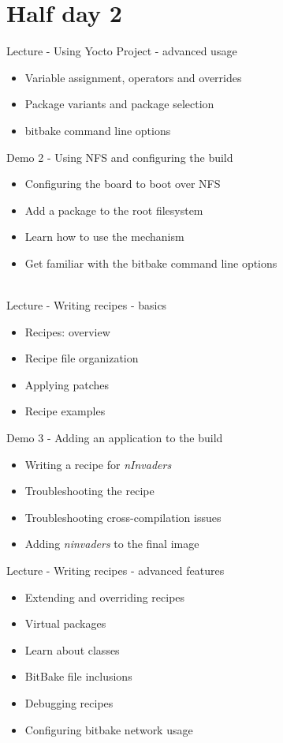 \documentclass[a4paper,12pt,obeyspaces,spaces,hyphens]{article}
\begin{document}
\section{Half day 2}

\feagendatwocolumn
{Lecture - Using Yocto Project - advanced usage}
{
  \begin{itemize}
  \item Variable assignment, operators and overrides
  \item Package variants and package selection
  \item bitbake command line options
  \end{itemize}
}
{Demo 2 - Using NFS and configuring the build}
{
  \begin{itemize}
  \item Configuring the board to boot over NFS
  \item Add a package to the root filesystem
  \item Learn how to use the  mechanism
  \item Get familiar with the bitbake command line options
  \end{itemize}
}
\\

\feagendatwocolumn
{Lecture - Writing recipes - basics}
{
  \begin{itemize}
  \item Recipes: overview
  \item Recipe file organization
  \item Applying patches
  \item Recipe examples
  \end{itemize}
}
{Demo 3 - Adding an application to the build}
{
  \begin{itemize}
  \item Writing a recipe for {\em nInvaders}
  \item Troubleshooting the recipe
  \item Troubleshooting cross-compilation issues
  \item Adding {\em ninvaders} to the final image
  \end{itemize}
}

\feagendaonecolumn
{Lecture - Writing recipes - advanced features}
{
  \begin{itemize}
  \item Extending and overriding recipes
  \item Virtual packages
  \item Learn about classes
  \item BitBake file inclusions
  \item Debugging recipes
  \item Configuring bitbake network usage
  \end{itemize}
}
\end{document}
